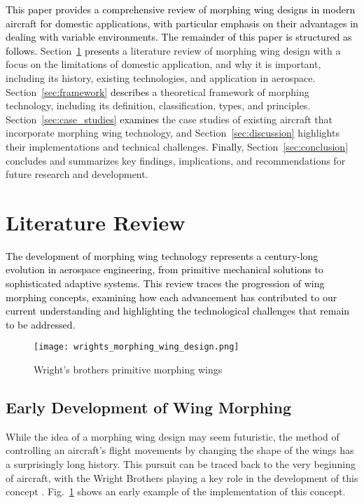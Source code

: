 \documentclass[letterpaper, journal, twoside]{IEEEtran}
\newcommand{\revision}[1]{\textcolor{black}{ #1}}
\begin{document}
\revision{This paper provides a comprehensive review of morphing wing designs in modern aircraft for domestic applications, with particular emphasis on their advantages in dealing with variable environments. The remainder of this paper is structured as follows.} Section~\ref{sec:related_work} \revision{presents} a literature review of morphing wing design with a focus on the limitations of domestic application, and why it is important, including its history, existing technologies, and application in aerospace. Section~\ref{sec:framework} \revision{describes} a theoretical framework of morphing technology, including its definition, classification, types, and principles. Section~\ref{sec:case_studies} \revision{examines} the case studies of existing aircraft that incorporate morphing wing technology, and Section~\ref{sec:discussion} highlights their implementations and technical challenges. \revision{Finally}, Section~\ref{sec:conclusion} concludes and summarizes key findings, implications, and recommendations for future research and development.


\section{Literature Review}\label{sec:related_work}

\revision{The development of morphing wing technology represents a century-long evolution in aerospace engineering, from primitive mechanical solutions to sophisticated adaptive systems. This review traces the progression of wing morphing concepts, examining how each advancement has contributed to our current understanding and highlighting the technological challenges that remain to be addressed.}


\begin{figure}
    \centering
    \texttt{[image: wrights\_morphing\_wing\_design.png]}
    \caption{Wright’s brothers primitive morphing wings ~\cite{choi2017idea}}
    \label{fig:wrights_morphing_wing_design}
\end{figure}

\subsection{Early Development of Wing Morphing}
While the idea of a morphing wing design may seem futuristic, the method of controlling an aircraft's flight movements by changing the shape of the wings has a surprisingly long history. This pursuit can be traced back to the very beginning of aircraft, with the Wright Brothers playing a key role in the development of this concept \cite{choi2017idea, nasm2022researching}. Fig.~\ref{fig:wrights_morphing_wing_design} shows an early example of the implementation of this concept. 
\end{document}
